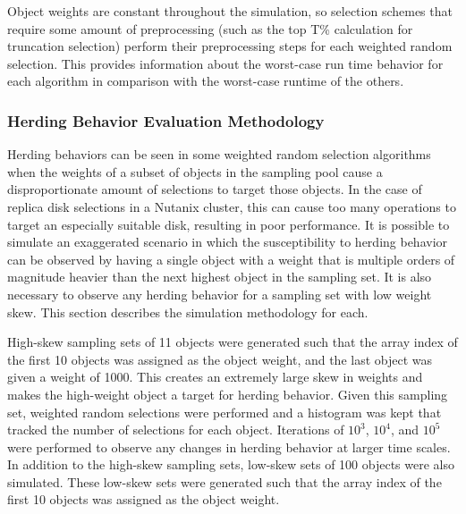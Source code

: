 \documentclass[12pt]{article}
\begin{document}
    Object weights are constant throughout the simulation, so selection schemes
    that require some amount of preprocessing (such as the top T\% calculation
    for truncation selection) perform their preprocessing steps for each
    weighted random selection. This provides information about the worst-case
    run time behavior for each algorithm in comparison with the worst-case
    runtime of the others.

    \subsubsection{Herding Behavior Evaluation Methodology}
    Herding behaviors can be seen in some weighted random selection
    algorithms when the weights of a subset of objects in the sampling pool
    cause a disproportionate amount of selections to target those objects. In
    the case of replica disk selections in a Nutanix cluster, this can cause
    too many operations to target an especially suitable disk, resulting in
    poor performance. It is possible to simulate an exaggerated scenario in
    which the susceptibility to herding behavior can be observed by having a
    single object with a weight that is multiple orders of magnitude heavier
    than the next highest object in the sampling set. It is also necessary to
    observe any herding behavior for a sampling set with low weight skew. This
    section describes the simulation methodology for each.

    High-skew sampling sets of 11 objects were generated such that the array
    index of the first 10 objects was assigned as the object weight, and the
    last object was given a weight of 1000. This creates an extremely large
    skew in weights and makes the high-weight object a target for herding
    behavior. Given this sampling set, weighted random selections were
    performed and a histogram was kept that tracked the number of selections
    for each object. Iterations of $10^3$, $10^4$, and $10^5$ were performed to
    observe any changes in herding behavior at larger time scales. In addition
    to the high-skew sampling sets, low-skew sets of 100 objects were also
    simulated.  These low-skew sets were generated such that the array
    index of the first 10 objects was assigned as the object weight.
\end{document}
